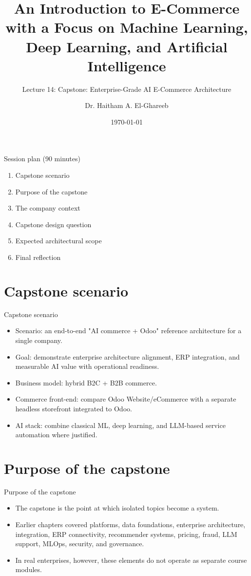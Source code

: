 \documentclass[aspectratio=169]{beamer}
\title[Lecture 14]{An Introduction to E-Commerce\\\small with a Focus on Machine Learning, Deep Learning, and Artificial Intelligence}
\subtitle{Lecture 14: Capstone: Enterprise-Grade AI E-Commerce Architecture}
\author{Dr. Haitham A. El-Ghareeb}
\institute{Faculty of Computers and Information Sciences \\ Mansoura University \\ Egypt}
\date{\today}
\begin{document}
\begin{frame}
  \titlepage
\end{frame}

\begin{frame}{Session plan (90 minutes)}
  \begin{enumerate}
    \item Capstone scenario
    \item Purpose of the capstone
    \item The company context
    \item Capstone design question
    \item Expected architectural scope
    \item Final reflection
  \end{enumerate}
\end{frame}

\section{Capstone scenario}

\begin{frame}{Capstone scenario}
  \begin{itemize}
    \item Scenario: an end-to-end "AI commerce + Odoo" reference architecture for a single company.
    \item Goal: demonstrate enterprise architecture alignment, ERP integration, and measurable AI value with operational readiness.
    \item Business model: hybrid B2C + B2B commerce.
    \item Commerce front-end: compare Odoo Website/eCommerce with a separate headless storefront integrated to Odoo.
    \item AI stack: combine classical ML, deep learning, and LLM-based service automation where justified.
  \end{itemize}
\end{frame}

\section{Purpose of the capstone}

\begin{frame}{Purpose of the capstone}
  \begin{itemize}
    \item The capstone is the point at which isolated topics become a system.
    \item Earlier chapters covered platforms, data foundations, enterprise architecture, integration, ERP connectivity, recommender systems, pricing, fraud, LLM support, MLOps, security, and governance.
    \item In real enterprises, however, these elements do not operate as separate course modules.
  \end{itemize}
\end{frame}
\end{document}
